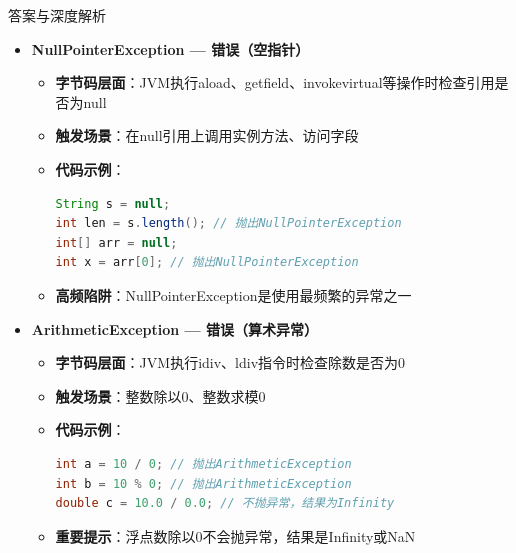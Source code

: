 \documentclass[12pt, a4paper]{ctexart}
\begin{document}
\begin{enumerate}[label=\textbf{\arabic*.}]
\begin{bluebox}{答案与深度解析}
\begin{itemize}[leftmargin=*, nosep, label={}]
			      \item[B] \textbf{NullPointerException — 错误（空指针）}
			            \begin{itemize}[label={}, leftmargin=*, nosep]
				            \item \textbf{字节码层面}：JVM执行aload、getfield、invokevirtual等操作时检查引用是否为null
				            \item \textbf{触发场景}：在null引用上调用实例方法、访问字段
				            \item \textbf{代码示例}：
				                  \begin{lstlisting}[language=Java]
String s = null;
int len = s.length(); // 抛出NullPointerException
int[] arr = null;
int x = arr[0]; // 抛出NullPointerException
				            \end{lstlisting}
				            \item \textbf{高频陷阱}：NullPointerException是使用最频繁的异常之一
			            \end{itemize}

			      \item[C] \textbf{ArithmeticException — 错误（算术异常）}
			            \begin{itemize}[label={}, leftmargin=*, nosep]
				            \item \textbf{字节码层面}：JVM执行idiv、ldiv指令时检查除数是否为0
				            \item \textbf{触发场景}：整数除以0、整数求模0
				            \item \textbf{代码示例}：
				                  \begin{lstlisting}[language=Java]
int a = 10 / 0; // 抛出ArithmeticException
int b = 10 % 0; // 抛出ArithmeticException
double c = 10.0 / 0.0; // 不抛异常，结果为Infinity
				            \end{lstlisting}
				            \item \textbf{重要提示}：浮点数除以0不会抛异常，结果是Infinity或NaN
			            \end{itemize}


\end{itemize}
\end{bluebox}
\end{enumerate}
\end{document}

